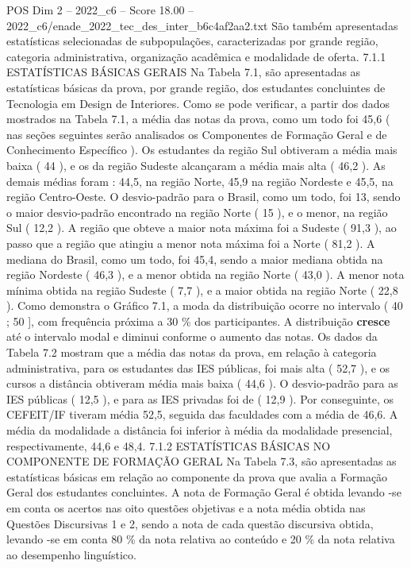 \begin{textsample}{POS Dim 2 – 2022\_c6 – Score 18.00 – 2022\_c6/enade\_2022\_tec\_des\_inter\_b6c4af2aa2.txt}
São também apresentadas estatísticas selecionadas de subpopulações, caracterizadas por grande região, categoria administrativa, organização acadêmica e modalidade de oferta. 7.1.1 ESTATÍSTICAS BÁSICAS GERAIS Na Tabela 7.1, são apresentadas as estatísticas básicas da prova, por grande região, dos estudantes concluintes de Tecnologia em Design de Interiores.
Como se pode verificar, a partir dos dados mostrados na Tabela 7.1, a média das notas da prova, como um todo foi 45,6 ( nas seções seguintes serão analisados os Componentes de Formação Geral e de Conhecimento Específico ).
Os estudantes da região Sul obtiveram a média mais baixa ( 44 ), e os da região Sudeste alcançaram a média mais alta ( 46,2 ).
As demais médias foram : 44,5, na região Norte, 45,9 na região Nordeste e 45,5, na região Centro-Oeste.
O desvio-padrão para o Brasil, como um todo, foi 13, sendo o maior desvio-padrão encontrado na região Norte ( 15 ), e o menor, na região Sul ( 12,2 ).
A região que obteve a maior nota máxima foi a Sudeste ( 91,3 ), ao passo que a região que atingiu a menor nota máxima foi a Norte ( 81,2 ).
A mediana do Brasil, como um todo, foi 45,4, sendo a maior mediana obtida na região Nordeste ( 46,3 ), e a menor obtida na região Norte ( 43,0 ).
A menor nota mínima obtida na região Sudeste ( 7,7 ), e a maior obtida na região Norte ( 22,8 ).
Como demonstra o Gráfico 7.1, a moda da distribuição ocorre no intervalo ( 40 ; 50 ], com frequência próxima a 30 \% dos participantes.
A distribuição \textbf{cresce} até o intervalo modal e diminui conforme o aumento das notas.
Os dados da Tabela 7.2 mostram que a média das notas da prova, em relação à categoria administrativa, para os estudantes das IES públicas, foi mais alta ( 52,7 ), e os cursos a distância obtiveram média mais baixa ( 44,6 ).
O desvio-padrão para as IES públicas ( 12,5 ), e para as IES privadas foi de ( 12,9 ).
Por conseguinte, os CEFEIT/IF tiveram média 52,5, seguida das faculdades com a média de 46,6.
A média da modalidade a distância foi inferior à média da modalidade presencial, respectivamente, 44,6 e 48,4. 7.1.2 ESTATÍSTICAS BÁSICAS NO COMPONENTE DE FORMAÇÃO GERAL Na Tabela 7.3, são apresentadas as estatísticas básicas em relação ao componente da prova que avalia a Formação Geral dos estudantes concluintes.
A nota de Formação Geral é obtida levando -se em conta os acertos nas oito questões objetivas e a nota média obtida nas Questões Discursivas 1 e 2, sendo a nota de cada questão discursiva obtida, levando -se em conta 80 \% da nota relativa ao conteúdo e 20 \% da nota relativa ao desempenho linguístico.

\end{textsample}
